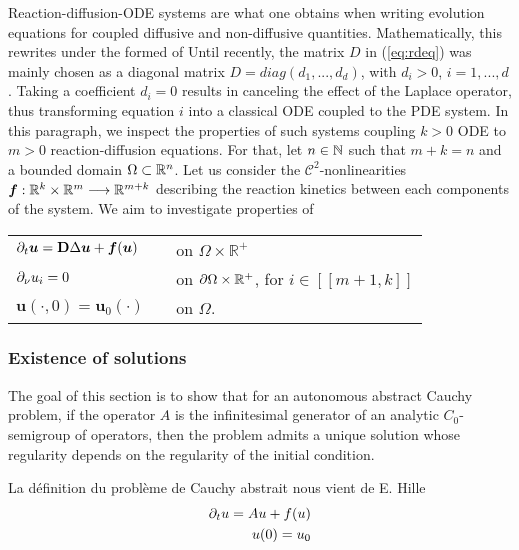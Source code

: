 Reaction-diffusion-ODE systems are what one obtains when writing evolution equations for coupled diffusive and non-diffusive quantities. Mathematically, this rewrites under the formed of Until recently, the matrix $D$ in (\ref{eq:rdeq}) was mainly chosen as a diagonal matrix $D = diag(d_1, ..., d_d)$, with $d_i > 0$, $i = 1, ..., d$. Taking a coefficient $d_i = 0$ results in canceling the effect of the Laplace operator, thus transforming equation $i$ into a classical ODE coupled to the PDE system. In this paragraph, we inspect the properties of such systems coupling $k >0$ ODE to $m > 0$ reaction-diffusion equations. For that, let $n \in \mathbb{N}$ such that $m+k = n$ and a bounded domain $\Omega \subset \mathbb{R}^{n}$. Let us consider the $\mathcal{C}^2$-nonlinearities $\bm f : \mathbb{R}^k \times \mathbb{R}^m \longrightarrow \mathbb{R}^{m+k}$ describing the reaction kinetics between each components of the system. We aim to investigate properties of
 
\vspace{1em}
\begin{center}
\begin{tabular}{lcl}
	$\partial_t\bm{u}  = \bm{\mathrm D} \Delta \bm{u} + \bm{f}(\bm{u})$ & & on $\Omega \times \mathbb R^{+}$ \\[0.5em] $\partial_\nu u_i = 0$ & &on $\partial\Omega \times \mathbb R^{+}$, for $i \in [\![ m+1, k ]\!]$ \\[0.5em]
	$\bm{u}(\cdot, 0) = \bm{u}_0(\cdot)$ & &on $\Omega$.
\end{tabular}
\end{center}


\subsubsection{Existence of solutions}

The goal of this section is to show that for an autonomous abstract Cauchy problem, if the operator $A$ is the infinitesimal generator of an analytic $C_0$-semigroup of operators, then the problem admits a unique solution whose regularity depends on the regularity of the initial condition.

\begin{definition} La définition du problème de Cauchy abstrait nous vient de E. Hille 
	\begin{align}
		\partial_t u = Au + f(u) \notag \\
		u(0) = u_0 \notag
	\end{align}
\end{definition}

